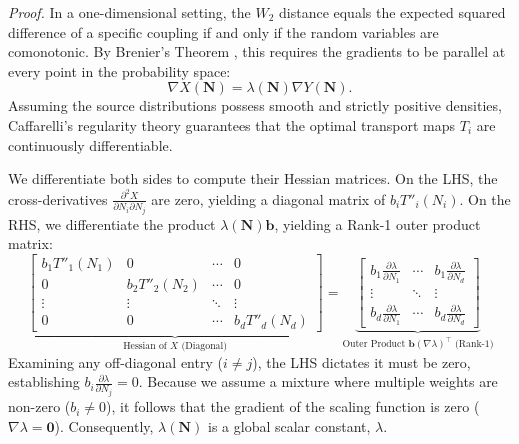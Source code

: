 \documentclass{tpm2026} %
\begin{document}
\textit{Proof.} In a one-dimensional setting, the $W_2$ distance equals the expected squared difference of a specific coupling if and only if the random variables are comonotonic. By Brenier's Theorem \citep{brenier1991}, this requires the gradients to be parallel at every point in the probability space:
\begin{equation}
    \nabla X(\mathbf{N}) = \lambda(\mathbf{N}) \nabla Y(\mathbf{N}).
\end{equation}
Assuming the source distributions possess smooth and strictly positive densities, Caffarelli's regularity theory \citep{caffarelli1992} guarantees that the optimal transport maps $T_i$ are continuously differentiable. 

We differentiate both sides to compute their Hessian matrices. On the LHS, the cross-derivatives $\frac{\partial^2 X}{\partial N_i \partial N_j}$ are zero, yielding a diagonal matrix of $b_i T''_i(N_i)$. On the RHS, we differentiate the product $\lambda(\mathbf{N}) \mathbf{b}$, yielding a Rank-1 outer product matrix:
\begin{equation}
    \underbrace{
    \begin{bmatrix} 
    b_1 T''_1(N_1) & 0 & \cdots & 0 \\
    0 & b_2 T''_2(N_2) & \cdots & 0 \\
    \vdots & \vdots & \ddots & \vdots \\
    0 & 0 & \cdots & b_d T''_d(N_d)
    \end{bmatrix}
    }_{\text{Hessian of } X \text{ (Diagonal)}}
    =
    \underbrace{
    \begin{bmatrix}
    b_1 \frac{\partial \lambda}{\partial N_1} & \cdots & b_1 \frac{\partial \lambda}{\partial N_d} \\
    \vdots & \ddots & \vdots \\
    b_d \frac{\partial \lambda}{\partial N_1} & \cdots & b_d \frac{\partial \lambda}{\partial N_d}
    \end{bmatrix}
    }_{\text{Outer Product } \mathbf{b} (\nabla \lambda)^\top \text{ (Rank-1)}}
\end{equation}
Examining any off-diagonal entry ($i \neq j$), the LHS dictates it must be zero, establishing $b_i \frac{\partial \lambda}{\partial N_j} = 0$. Because we assume a mixture where multiple weights are non-zero ($b_i \neq 0$), it follows that the gradient of the scaling function is zero ($\nabla \lambda = \mathbf{0}$). Consequently, $\lambda(\mathbf{N})$ is a global scalar constant, $\lambda$.
\end{document}
